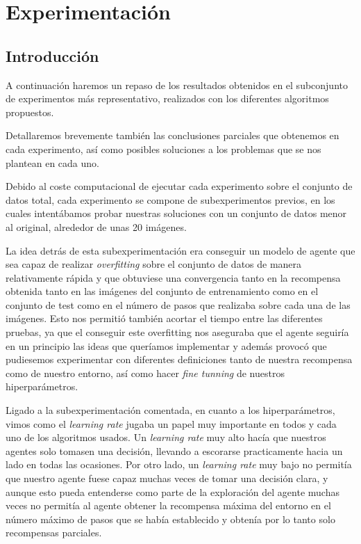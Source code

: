 
\cleardoublepage

\chapter{Experimentación}
\label{experimentacion}

\section{Introducción}
\label{resultados-introduccion}

A continuación haremos un repaso de los resultados obtenidos en el subconjunto de experimentos más representativo, realizados con los diferentes algoritmos propuestos.
\medskip

Detallaremos brevemente también las conclusiones parciales que obtenemos en cada experimento, así como posibles soluciones a los problemas que se nos plantean en cada uno.
\medskip

Debido al coste computacional de ejecutar cada experimento sobre el conjunto de datos total, cada experimento se compone de subexperimentos previos, en los cuales intentábamos probar nuestras soluciones con un conjunto de datos menor al original, alrededor de unas 20 imágenes. 
\medskip

La idea detrás de esta subexperimentación era conseguir un modelo de agente que sea capaz de realizar \textit{overfitting} sobre el conjunto de datos de manera relativamente rápida y que obtuviese una convergencia tanto en la recompensa obtenida tanto en las imágenes del conjunto de entrenamiento como en el conjunto de test como en el número de pasos que realizaba sobre cada una de las imágenes. Esto nos permitió también acortar el tiempo entre las diferentes pruebas, ya que el conseguir este overfitting nos aseguraba que el agente seguiría en un principio las ideas que queríamos implementar y además provocó que pudiesemos experimentar con diferentes definiciones tanto de nuestra recompensa como de nuestro entorno, así como hacer \textit{fine tunning} de nuestros hiperparámetros.
\medskip

Ligado a la subexperimentación comentada, en cuanto a los hiperparámetros, vimos como el \textit{learning rate} jugaba un papel muy importante en todos y cada uno de los algoritmos usados. Un \textit{learning rate} muy alto hacía que nuestros agentes solo tomasen una decisión, llevando a escorarse practicamente hacia un lado en todas las ocasiones. Por otro lado, un \textit{learning rate} muy bajo no permitía que nuestro agente fuese capaz muchas veces de tomar una decisión clara, y aunque esto pueda entenderse como parte de la exploración del agente muchas veces no permitía al agente obtener la recompensa máxima del entorno en el número máximo de pasos que se había establecido y obtenía por lo tanto solo recompensas parciales.
\medskip


